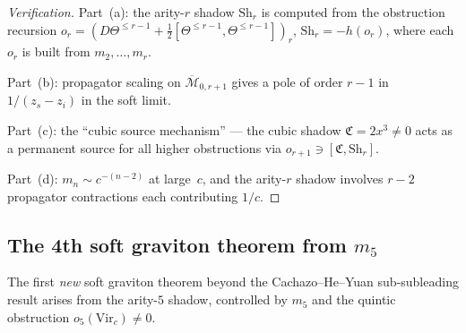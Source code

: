 \documentclass[11pt]{article}
\begin{document}
\begin{proof}[Verification]
Part~(a): the arity-$r$ shadow $\mathrm{Sh}_r$ is computed from the obstruction recursion $o_r = (D\Theta^{\le r-1} + \frac{1}{2}[\Theta^{\le r-1}, \Theta^{\le r-1}])_r$, $\mathrm{Sh}_r = -h(o_r)$, where each $o_r$ is built from $m_2, \ldots, m_r$.

Part~(b): propagator scaling on $\overline{\mathcal{M}}_{0,r+1}$ gives a pole of order $r-1$ in $1/(z_s - z_i)$ in the soft limit.

Part~(c): the ``cubic source mechanism'' --- the cubic shadow $\mathfrak{C} = 2x^3 \ne 0$ acts as a permanent source for all higher obstructions via $o_{r+1} \ni [\mathfrak{C}, \mathrm{Sh}_r]$.

Part~(d): $m_n \sim c^{-(n-2)}$ at large~$c$, and the arity-$r$ shadow involves $r - 2$ propagator contractions each contributing $1/c$.
\end{proof}

\subsection{The 4th soft graviton theorem from $m_5$}

The first \emph{new} soft graviton theorem beyond the Cachazo--He--Yuan sub-subleading result arises from the arity-$5$ shadow, controlled by $m_5$ and the quintic obstruction $o_5(\mathrm{Vir}_c) \ne 0$.
\end{document}
